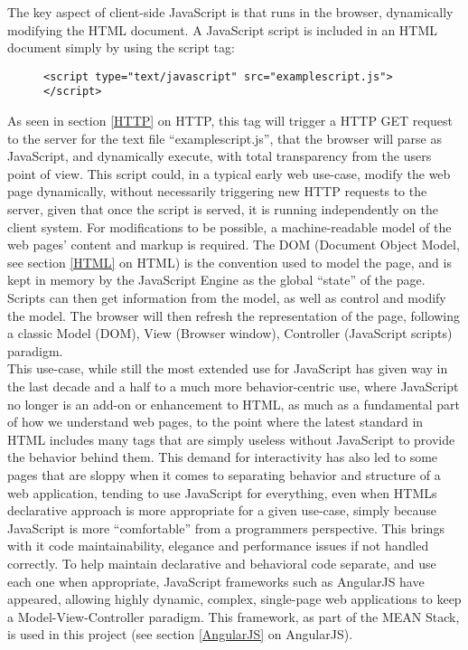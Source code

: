 The key aspect of client-side JavaScript is that runs in the browser, dynamically modifying the HTML document. A
JavaScript script is included in an HTML document simply by using the script tag:
\begin{figure}[h]
\centering
{}
\begin{verbatim}
<script type="text/javascript" src="examplescript.js"></script>
\end{verbatim}
\end{figure}

As seen in section \ref{HTTP} on HTTP, this tag will trigger a HTTP GET request to the server for the text file
``examplescript.js'', that the browser will parse as JavaScript, and dynamically execute, with total transparency
from the users point of view. This script could, in a typical early web use-case, modify the web page dynamically,
without necessarily triggering new HTTP requests to the server, given that once the script is served, it is running
independently on the client system. For modifications to be possible, a machine-readable model of the web pages' content
and markup is required. The DOM (Document Object Model, see section \ref{HTML} on HTML) is the convention used to model
the page, and is kept in memory by the JavaScript Engine as the global ``state'' of the page. Scripts can then get
information from the model, as well as control and modify the model. The browser will then refresh the representation of
the page, following a classic Model (DOM), View (Browser window), Controller (JavaScript scripts) paradigm.\\

This use-case, while still the most extended use for JavaScript has given way in the last decade and a half to a much
more behavior-centric use, where JavaScript no longer is an add-on or enhancement to HTML, as much as a fundamental part
of how we understand web pages, to the point where the latest standard in HTML includes many tags that are simply useless
without JavaScript to provide the behavior behind them. This demand for interactivity has also led to some pages that are
sloppy when it comes to separating behavior and structure of a web application, tending to use JavaScript for everything,
even when HTMLs declarative approach is more appropriate for a given use-case, simply because JavaScript is more
``comfortable'' from a programmers perspective. This brings with it code maintainability, elegance and performance issues
if not handled correctly. To help maintain declarative and behavioral code separate, and use each one when appropriate,
JavaScript frameworks such as AngularJS have appeared, allowing highly dynamic, complex, single-page web applications to
keep a Model-View-Controller paradigm. This framework, as part of the MEAN Stack, is used in this project (see section
\ref{AngularJS} on AngularJS).

